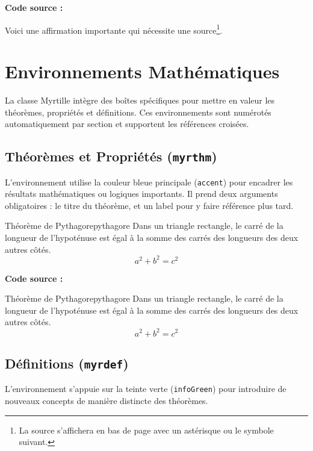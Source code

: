 \textbf{Code source :}
\begin{texblock}
Voici une affirmation importante qui nécessite une source\footnote{La source s'affichera en bas de page avec un astérisque ou le symbole suivant.}.
\end{texblock}

\section{Environnements Mathématiques}

La classe Myrtille intègre des boîtes spécifiques pour mettre en valeur les théorèmes, propriétés et définitions. Ces environnements sont numérotés automatiquement par section et supportent les références croisées.

\subsection{Théorèmes et Propriétés (\texttt{myrthm})}

L'environnement  utilise la couleur bleue principale (\texttt{accent}) pour encadrer les résultats mathématiques ou logiques importants. Il prend deux arguments obligatoires : le titre du théorème, et un label pour y faire référence plus tard.

\begin{myrthm}{Théorème de Pythagore}{pythagore}
  Dans un triangle rectangle, le carré de la longueur de l'hypoténuse est égal à la somme des carrés des longueurs des deux autres côtés.
  \[ a^2 + b^2 = c^2 \]
\end{myrthm}

\textbf{Code source :}
\begin{texblock}
\begin{myrthm}{Théorème de Pythagore}{pythagore}
  Dans un triangle rectangle, le carré de la longueur de l'hypoténuse est égal à la somme des carrés des longueurs des deux autres côtés.
  \[ a^2 + b^2 = c^2 \]
\end{myrthm}
\end{texblock}

\subsection{Définitions (\texttt{myrdef})}

L'environnement  s'appuie sur la teinte verte (\texttt{infoGreen}) pour introduire de nouveaux concepts de manière distincte des théorèmes.


